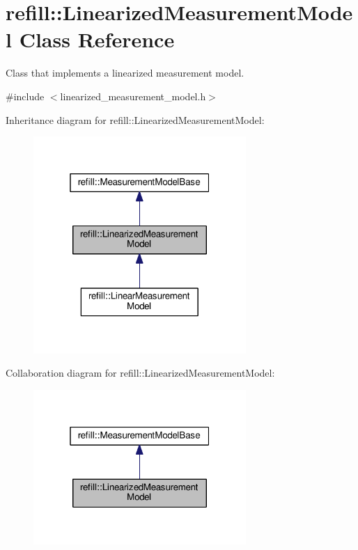 \hypertarget{classrefill_1_1LinearizedMeasurementModel}{}\section{refill\+:\+:Linearized\+Measurement\+Model Class Reference}
\label{classrefill_1_1LinearizedMeasurementModel}


Class that implements a linearized measurement model.  




{\ttfamily \#include $<$linearized\+\_\+measurement\+\_\+model.\+h$>$}



Inheritance diagram for refill\+:\+:Linearized\+Measurement\+Model\+:\nopagebreak
\begin{figure}[H]
\begin{center}
\leavevmode
\includegraphics[width=229pt]{classrefill_1_1LinearizedMeasurementModel__inherit__graph}
\end{center}
\end{figure}


Collaboration diagram for refill\+:\+:Linearized\+Measurement\+Model\+:\nopagebreak
\begin{figure}[H]
\begin{center}
\leavevmode
\includegraphics[width=229pt]{classrefill_1_1LinearizedMeasurementModel__coll__graph}
\end{center}
\end{figure}
